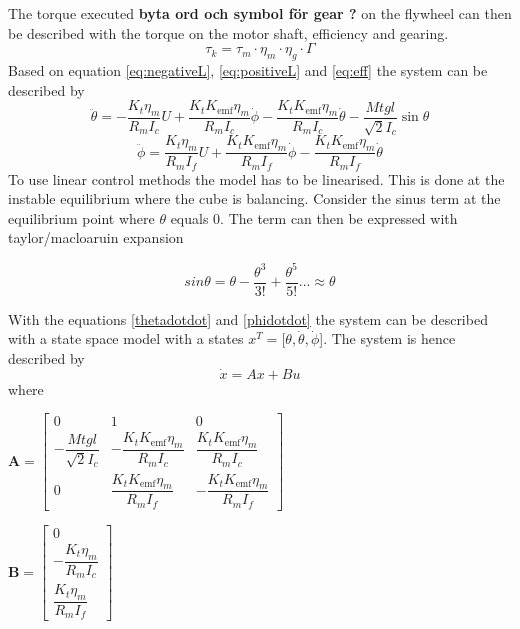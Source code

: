 \documentclass[a4paper,11pt]{kth-mag}
\begin{document}
The torque executed \textbf{byta ord  och symbol för gear ?} on the flywheel can then be described with the torque on the motor shaft, efficiency and gearing.
\begin{equation} \label{eq:eff}
\tau_k = \tau_m \cdot \eta_m \cdot \eta_g \cdot \Gamma
\end{equation}
Based on equation \eqref{eq:negativeL}, \eqref{eq:positiveL} and \eqref{eq:eff} the system can be described by
\begin{equation}
\ddot{\theta} = -\frac{K_t \eta_m}{R_m I_c} U + \frac{K_t K_{\text{emf}} \eta_m}{R_m I_c} \dot{\phi} - \frac{K_t K_{\text{emf}} \eta_m}{R_m I_c} \dot{\theta} - \frac{Mt g l }{\sqrt{2} I_c} \sin \theta \label{thetadotdot}
\end{equation}
\begin{equation}
\ddot{\phi} = \frac{K_t \eta_m}{R_m I_f} U + \frac{K_t K_{\text{emf}} \eta_m}{R_m I_f} \dot{\phi} - \frac{K_t K_{\text{emf}} \eta_m}{R_m I_f} \dot{\theta} 
\label{phidotdot}
\end{equation} 
To use linear control methods the model has to be linearised. This is done at the instable equilibrium where the cube is balancing. Consider the sinus term at the equilibrium point where $\theta$ equals $0$. The term can then be expressed with taylor/macloaruin expansion

\begin{equation} \label{eq: sinus taylor}
sin \theta = \theta - \frac{\theta^3}{3!} +\frac{\theta^5}{5!}... \approx \theta 
\end{equation}

With the equations \eqref{thetadotdot} and \eqref{phidotdot} the system can be described with a state space model with a states $x^T = [\theta, \dot{\theta}, \dot{\phi}$]. The system is hence described by
\begin{equation}
\dot{x} = Ax + Bu
\end{equation} 
where \\
\begin{center}
$\textbf{A} =\begin{bmatrix}
0 & 1 & 0 \\
-\dfrac{Mt g l }{\sqrt{2} I_c} & - \dfrac{K_t K_{\text{emf}} \eta_m}{R_m I_c} & \dfrac{K_t K_{\text{emf}} \eta_m}{R_m I_c} \\ 
0 & \dfrac{K_t K_{\text{emf}} \eta_m}{R_m I_f} & -\dfrac{K_t K_{\text{emf}} \eta_m}{R_m I_f}
\end{bmatrix}$

$\textbf{B} = \begin{bmatrix}
0 \\ 
-\dfrac{K_t \eta_m}{R_m I_c} \\
\dfrac{K_t \eta_m}{R_m I_f}
\end{bmatrix} $
\end{center}
 
\end{document}
